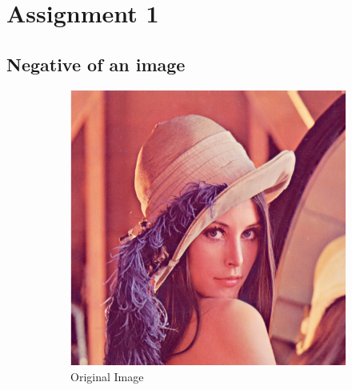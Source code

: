 \documentclass[a4paper,16pt]{article}
\begin{document}
	
	
	\tableofcontents
	
	\newpage
	
	\section{Assignment 1}
	\vspace{0.2in}
	\subsection{Negative of an image}
	\indent	
	\begin{figure}[h!]
		\begin{subfigure}[h]{0.4\linewidth}
			\includegraphics[width=\linewidth]{original}
			\caption{Original Image}
		\end{subfigure}
		\hfill
		\begin{subfigure}[h]{0.4\linewidth}

\end{subfigure}
\end{figure}
\end{document}
